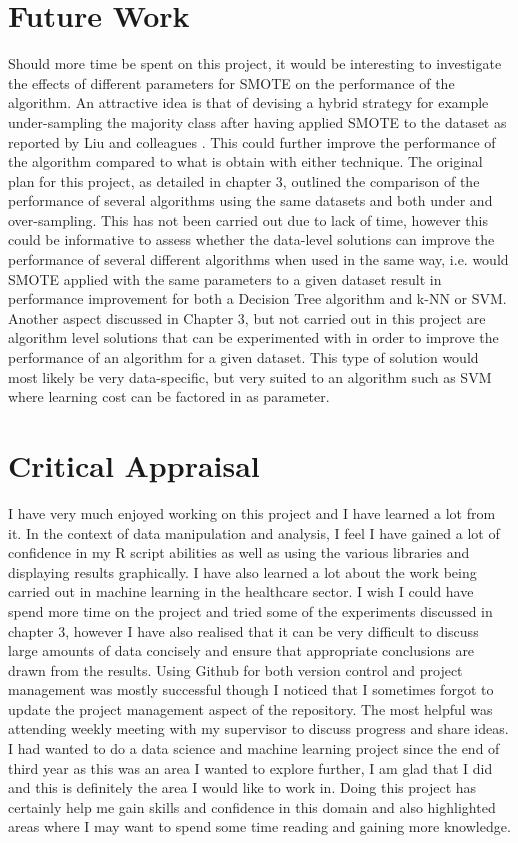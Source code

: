 \section{Future Work}
Should more time be spent on this project, it would be interesting to investigate the effects of different parameters for SMOTE on the performance of the algorithm.
An attractive idea is that of devising a hybrid strategy for example under-sampling the majority class after having applied SMOTE to the dataset as reported by Liu and colleagues \citep{Liu:2006ij}. This could further improve the performance of the algorithm compared to what is obtain with either technique.\newline
The original plan for this project, as detailed in chapter 3, outlined the comparison of the performance of several algorithms using the same datasets and both under and over-sampling. This has not been carried out due to lack of time, however this could be informative to assess whether the data-level solutions can improve the performance of several different algorithms when used in the same way, i.e. would SMOTE applied with the same parameters to a given dataset result in performance improvement for both a Decision Tree algorithm and k-NN or SVM.\newline
Another aspect discussed in Chapter 3, but not carried out in this project are algorithm level solutions that can be experimented with in order to improve the performance of an algorithm for a given dataset. This type of solution would most likely be very data-specific, but very suited to an algorithm such as SVM where learning cost can be factored in as parameter.

\section{Critical Appraisal}
I have very much enjoyed working on this project and I have learned a lot from it. In the context of data manipulation and analysis, I feel I have gained a lot of confidence in my R script abilities as well as using the various libraries and displaying results graphically. I have also learned a lot about the work being carried out in machine learning in the healthcare sector. 
I wish I could have spend more time on the project and tried some of the experiments discussed in chapter 3, however I have also realised that it can be very difficult to discuss large amounts of data concisely and ensure that appropriate conclusions are drawn from the results.
Using Github for both version control and project management was mostly successful though I noticed that I sometimes forgot to update the project management aspect of the repository. The most helpful was attending weekly meeting with my supervisor to discuss progress and share ideas.
I had wanted to do a data science and machine learning project since the end of third year as this was an area I wanted to explore further, I am glad that I did and this is definitely the area I would like to work in. Doing this project has certainly help me gain skills and confidence in this domain and also highlighted areas where I may want to spend some time reading and gaining more knowledge.